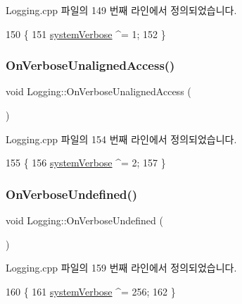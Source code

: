 Logging.\+cpp 파일의 149 번째 라인에서 정의되었습니다.


\begin{DoxyCode}
150 \{
151   \mbox{\hyperlink{system_8cpp_a67739df6b2271a8b807f01c50a610478}{systemVerbose}} ^= 1;
152 \}
\end{DoxyCode}
\mbox{\label{class_logging_ab6beb507c8821168ba87abc732eb6ca1}} 
\subsubsection{\texorpdfstring{On\+Verbose\+Unaligned\+Access()}{OnVerboseUnalignedAccess()}}
{\footnotesize\ttfamily void Logging\+::\+On\+Verbose\+Unaligned\+Access (\begin{DoxyParamCaption}{ }\end{DoxyParamCaption})\hspace{0.3cm}{\ttfamily [protected]}}



Logging.\+cpp 파일의 154 번째 라인에서 정의되었습니다.


\begin{DoxyCode}
155 \{
156   \mbox{\hyperlink{system_8cpp_a67739df6b2271a8b807f01c50a610478}{systemVerbose}} ^= 2;
157 \}
\end{DoxyCode}
\mbox{\label{class_logging_a7b4d1fd1026a4b1746f83847b0aee17e}} 
\subsubsection{\texorpdfstring{On\+Verbose\+Undefined()}{OnVerboseUndefined()}}
{\footnotesize\ttfamily void Logging\+::\+On\+Verbose\+Undefined (\begin{DoxyParamCaption}{ }\end{DoxyParamCaption})\hspace{0.3cm}{\ttfamily [protected]}}



Logging.\+cpp 파일의 159 번째 라인에서 정의되었습니다.


\begin{DoxyCode}
160 \{
161   \mbox{\hyperlink{system_8cpp_a67739df6b2271a8b807f01c50a610478}{systemVerbose}} ^= 256;
162 \}
\end{DoxyCode}
\mbox{\label{class_logging_ab1765bcb53cd404f0e511f5a20e05f78}} 
